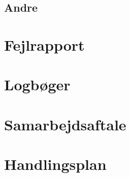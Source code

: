 \subsection{Andre}
\label{mailAndre}

\section{Fejlrapport}
\label{Fejlrapport}

\section{Logbøger}
\label{bilag:Logboger}

\section{Samarbejdsaftale}
\label{bilag:samarbejdsaftale}

\section{Handlingsplan}
\label{bilag:Handlingsplan}